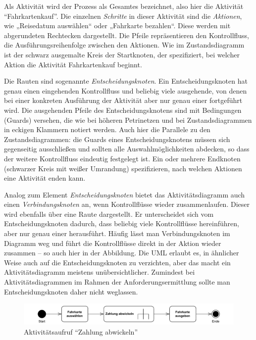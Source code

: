 Als Aktivität wird der Prozess als Gesamtes bezeichnet, 
also hier die Aktivität "`Fahrkartenkauf"'. Die einzelnen \textit{Schritte} in dieser Aktivität sind die \textit{Aktionen}, wie „Reisedatum auswählen“ oder „Fahrkarte bezahlen“. Diese werden mit abgerundeten Rechtecken dargestellt. Die Pfeile repräsentieren den Kontrollfluss, die Ausführungsreihenfolge zwischen den Aktionen. Wie im Zustandsdiagramm ist der schwarz ausgemalte Kreis der Startknoten, der spezifiziert, bei welcher Aktion die Aktivität Fahrkartenkauf beginnt.

Die Rauten sind sogenannte \textit{Entscheidungsknoten}. Ein Entscheidungsknoten hat genau einen eingehenden Kontrollfluss und beliebig viele ausgehende, von denen bei einer konkreten Ausführung der Aktivität aber nur genau einer fortgeführt wird. Die ausgehenden Pfeile des Entscheidungsknotens sind mit Bedingungen (Guards) versehen, die wie bei höheren Petrinetzen und bei Zustandsdiagrammen in eckigen Klammern notiert werden. Auch hier die Parallele zu den Zustandsdiagrammen: die Guards eines Entscheidungsknotens müssen sich gegenseitig ausschließen und sollten alle Auswahlmöglichkeiten abdecken, so dass der weitere Kontrollfluss eindeutig festgelegt ist. Ein oder mehrere Endknoten (schwarzer Kreis mit weißer Umrandung) spezifizieren, nach welchen Aktionen eine Aktivität enden kann.

Analog zum Element \textit{Entscheidungsknoten} bietet das Aktivitätsdiagramm auch einen \textit{Verbindungsknoten} an, wenn Kontrollflüsse wieder zusammenlaufen. Dieser wird ebenfalls über eine Raute dargestellt. Er unterscheidet sich vom Entscheidungsknoten dadurch, dass beliebig viele Kontrollflüsse hereinführen, aber nur genau einer herausführt. Häufig lässt man Verbindungsknoten im Diagramm weg und führt die Kontrollflüsse direkt in der Aktion wieder zusammen -- so auch hier in der Abbildung. Die UML erlaubt es, in ähnlicher Weise auch auf die Entscheidungsknoten zu verzichten, aber das macht ein Aktivitätsdiagramm meistens unübersichtlicher. Zumindest bei Aktivitätsdiagrammen im Rahmen der Anforderungsermittlung sollte man Entscheidungsknoten daher nicht weglassen.


\begin{figure}[h!]
	\centering
	\includegraphics[scale=0.7]{Bilder/Kapitel-5/aktivitaetsaufruf_zahlung.pdf}
	\caption{Aktivitätsaufruf "`Zahlung abwickeln"'}
	\label{fig:aktivitaetsaufruf_zahlung}
\end{figure}

